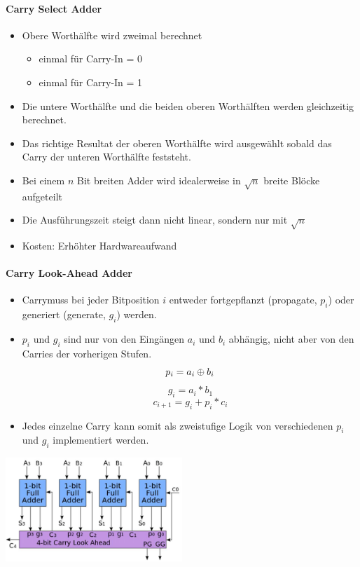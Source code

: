 \paragraph{Carry Select Adder}
\begin{itemize}
	\item Obere Worthälfte wird zweimal berechnet 
	\begin{itemize}
		\item einmal für Carry-In = 0 
		\item einmal für Carry-In = 1
	\end{itemize}
	\item Die untere Worthälfte und die beiden oberen Worthälften werden gleichzeitig berechnet.
	\item Das richtige Resultat der oberen Worthälfte wird ausgewählt sobald das Carry der unteren Worthälfte feststeht.
	\item Bei einem $n$ Bit breiten Adder wird idealerweise in $\sqrt{n}$ breite Blöcke aufgeteilt 
	\item Die Ausführungszeit steigt dann nicht linear, sondern nur mit $\sqrt{n}$
	\item Kosten: Erhöhter Hardwareaufwand
\end{itemize}

\paragraph{Carry Look-Ahead Adder}
	\begin{multicols}{2}
		\begin{itemize}
		\item Carrymuss bei jeder Bitposition $i$ entweder fortgepflanzt (propagate, $p_i$) oder generiert (generate, $g_i$) werden. 
		\item  $p_i$ und $g_i$ sind nur von den Eingängen $a_i$ und $b_i$ abhängig, nicht aber von den Carries der vorherigen Stufen. 
		\begin{equation}
			p_i = a_i \oplus b_i \newline	
		\end{equation}
		\begin{equation}
		g_i = a_i * b_1		
		\end{equation}
		\begin{equation}
		c_{i+1} = g_i + p_i * c_i		
		\end{equation}
		\item  Jedes einzelne Carry kann somit als zweistufige Logik von verschiedenen $p_i$ und $g_i$ implementiert werden. 
	\end{itemize}	
\columnbreak			
	\includegraphics[width=0.5\textwidth]{images/Arithmetik/Carry_Look_Ahead_Adder}
\end{multicols}

